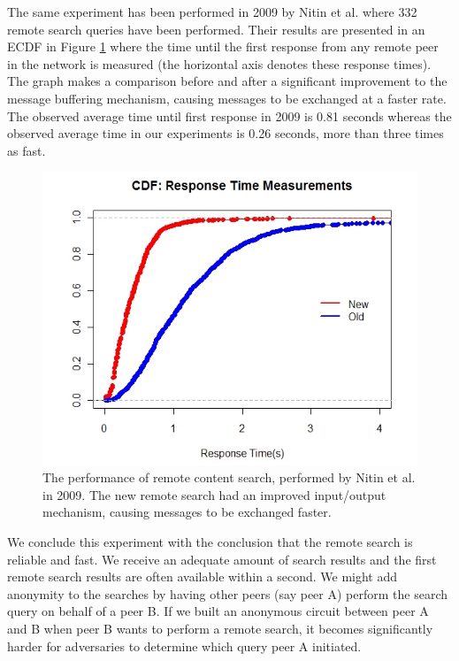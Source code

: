 The same experiment has been performed in 2009 by Nitin et al. where 332 remote search queries have been performed. Their results are presented in an ECDF in Figure \ref{fig:nitin_remote_search} where the time until the first response from any remote peer in the network is measured (the horizontal axis denotes these response times). The graph makes a comparison before and after a significant improvement to the message buffering mechanism, causing messages to be exchanged at a faster rate. The observed average time until first response in 2009 is 0.81 seconds whereas the observed average time in our experiments is 0.26 seconds, more than three times as fast.\\

\begin{figure}[!h]
	\centering
	\includegraphics[width=0.7\columnwidth]{images/experiments/nitin_remote_search}
	\caption{The performance of remote content search, performed by Nitin et al. in 2009. The new remote search had an improved input/output mechanism, causing messages to be exchanged faster.}
	\label{fig:nitin_remote_search}
\end{figure}

We conclude this experiment with the conclusion that the remote search is reliable and fast. We receive an adequate amount of search results and the first remote search results are often available within a second. We might add anonymity to the searches by having other peers (say peer A) perform the search query on behalf of a peer B. If we built an anonymous circuit between peer A and B when peer B wants to perform a remote search, it becomes significantly harder for adversaries to determine which query peer A initiated.

